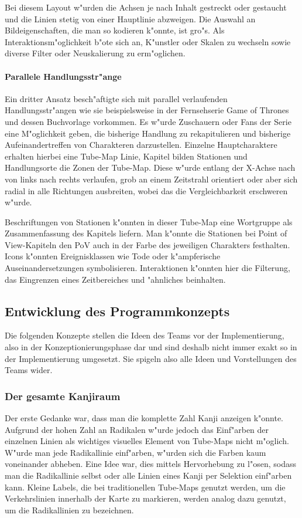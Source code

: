 Bei diesem Layout w"urden die Achsen je nach Inhalt gestreckt oder gestaucht und die Linien stetig von einer Hauptlinie abzweigen. Die Auswahl an Bildeigenschaften, die man so kodieren k"onnte, ist gro"s. Als Interaktionsm"oglichkeit b"ote sich an, K"unstler oder Skalen zu wechseln sowie diverse Filter oder Neuskalierung zu erm"oglichen. 

\paragraph{Parallele Handlungsstr"ange}
Ein dritter Ansatz besch"aftigte sich mit parallel verlaufenden Handlungsstr"angen wie sie beispielsweise in der Fernsehserie Game of Thrones und dessen Buchvorlage vorkommen. Es w"urde Zuschauern oder Fans der Serie eine M"oglichkeit geben, die bisherige Handlung zu rekapitulieren und bisherige Aufeinandertreffen von Charakteren darzustellen. Einzelne Hauptcharaktere erhalten hierbei eine Tube-Map Linie, Kapitel bilden Stationen und Handlungsorte die Zonen der Tube-Map. Diese w"urde entlang der X-Achse nach von links nach rechts verlaufen, grob an einem Zeitstrahl orientiert oder aber sich radial in alle Richtungen ausbreiten, wobei das die Vergleichbarkeit erschweren w"urde.

Beschriftungen von Stationen k"onnten in dieser Tube-Map eine Wortgruppe als Zusammenfassung des Kapitels liefern. Man k"onnte die Stationen bei Point of View-Kapiteln den PoV auch in der Farbe des jeweiligen Charakters festhalten. Icons k"onnten Ereignisklassen wie Tode oder k"ampferische Auseinandersetzungen symbolisieren. Interaktionen k"onnten hier die Filterung, das Eingrenzen eines Zeitbereiches und "ahnliches beinhalten. 


\subsection{Entwicklung des Programmkonzepts}
Die folgenden Konzepte stellen die Ideen des Teams vor der Implementierung, also in der Konzeptionierungsphase dar und sind deshalb nicht immer exakt so in der Implementierung umgesetzt. Sie spigeln also alle Ideen und Vorstellungen des Teams wider. 
\subsubsection{Der gesamte Kanjiraum}
Der erste Gedanke war, dass man die komplette Zahl Kanji anzeigen k"onnte. Aufgrund der hohen Zahl an Radikalen w"urde jedoch das Einf"arben der einzelnen Linien als wichtiges visuelles Element von Tube-Maps nicht m"oglich. W"urde man jede Radikallinie einf"arben, w"urden sich die Farben kaum voneinander abheben. Eine Idee war, dies mittels Hervorhebung zu l"osen, sodass man die Radikallinie selbst oder alle Linien eines Kanji per Selektion einf"arben kann. Kleine Labels, die bei traditionellen Tube-Maps genutzt werden, um die Verkehrslinien innerhalb der Karte zu markieren, werden analog dazu genutzt, um die Radikallinien zu bezeichnen.

